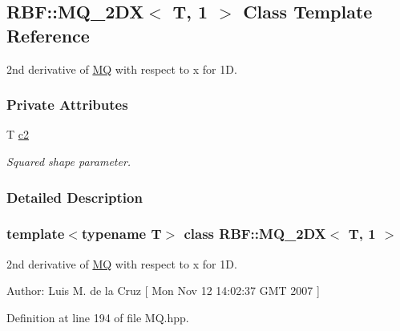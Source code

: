 \hypertarget{classRBF_1_1MQ__2DX_3_01T_00_011_01_4}{
\subsection{RBF::MQ\_\-2DX$<$ T, 1 $>$ Class Template Reference}
\label{classRBF_1_1MQ__2DX_3_01T_00_011_01_4}
}
2nd derivative of \hyperlink{classRBF_1_1MQ}{MQ} with respect to x for 1D.  


\subsubsection*{Private Attributes}
\begin{CompactItemize}
\item 
\hypertarget{classRBF_1_1MQ__2DX_3_01T_00_011_01_4_24be9b36293d1d3d750b5c61dbb36bcd}{
T \hyperlink{classRBF_1_1MQ__2DX_3_01T_00_011_01_4_24be9b36293d1d3d750b5c61dbb36bcd}{c2}}
\label{classRBF_1_1MQ__2DX_3_01T_00_011_01_4_24be9b36293d1d3d750b5c61dbb36bcd}

\begin{CompactList}\small\item\em Squared shape parameter. \item\end{CompactList}\end{CompactItemize}


\subsubsection{Detailed Description}
\subsubsection*{template$<$typename T$>$ class RBF::MQ\_\-2DX$<$ T, 1 $>$}

2nd derivative of \hyperlink{classRBF_1_1MQ}{MQ} with respect to x for 1D. 

\begin{Desc}
\item[Author:]Luis M. de la Cruz \mbox{[} Mon Nov 12 14:02:37 GMT 2007 \mbox{]} \end{Desc}


Definition at line 194 of file MQ.hpp.